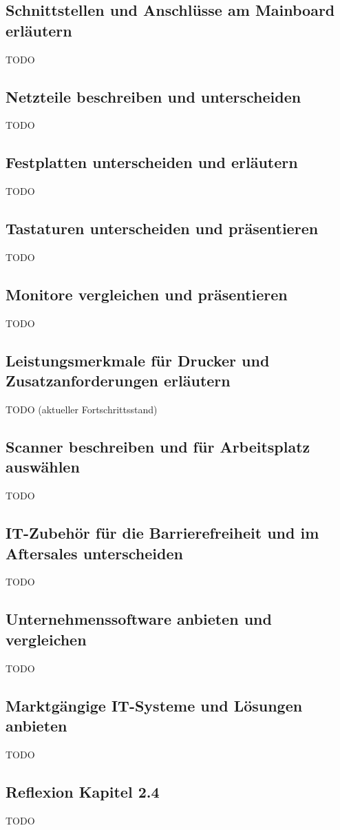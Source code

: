\subsection{Schnittstellen und Anschlüsse am Mainboard erläutern}
    TODO
\subsection{Netzteile beschreiben und unterscheiden}
    TODO
\subsection{Festplatten unterscheiden und erläutern}
    TODO
\subsection{Tastaturen unterscheiden und präsentieren}
    TODO
\subsection{Monitore vergleichen und präsentieren}
    TODO
\subsection{Leistungsmerkmale für Drucker und Zusatzanforderungen erläutern}
    TODO (aktueller Fortschrittsstand)
\subsection{Scanner beschreiben und für Arbeitsplatz auswählen}
    TODO
\subsection{IT-Zubehör für die Barrierefreiheit und im Aftersales unterscheiden}
    TODO
\subsection{Unternehmenssoftware anbieten und vergleichen}
    TODO
\subsection{Marktgängige IT-Systeme und Lösungen anbieten}
    TODO
\subsection*{Reflexion Kapitel 2.4}
    \begin{refindent}
        TODO
    \end{refindent}